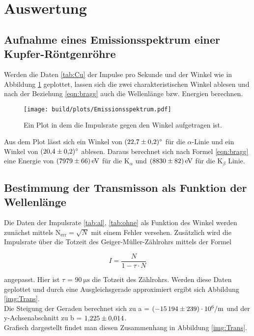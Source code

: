 \section{Auswertung}

    \subsection{Aufnahme eines Emissionsspektrum einer Kupfer-Röntgenröhre}

        \noindent Werden die Daten \ref{tab:Cu} der Impulse pro Sekunde und der Winkel wie in Abbildung \ref{img:Spekt} geplottet, lassen sich die zwei 
        charakteristischen Winkel ablesen und nach der Beziehung \ref{eqn:bragg} auch die Wellenlänge bzw. Energien berechnen.

            \begin{figure}
                \centering
                \texttt{[image: build/plots/Emissionsspektrum.pdf]}
                \caption{Ein Plot in dem die Impulsrate gegen den Winkel aufgetragen ist.}
                \label{img:Spekt}
            \end{figure}

        \noindent Aus dem Plot lässt sich ein Winkel von $\SI{22.7 \pm 0.2}{\degree}$ für die $\alpha$-Linie und ein Winkel von $\SI{20.4 \pm 0.2}{\degree}$
        ablesen. Daraus berechnet sich nach Formel \ref{eqn:bragg} eine Energie von $\SI{7979 \pm 66}{\electronvolt}$ für die $\text{K}_{\alpha}$ und
        $\SI{8830 \pm 82}{\electronvolt}$ für die $\text{K}_{\beta}$ Linie. 

    \subsection{Bestimmung der Transmisson als Funktion der Wellenlänge}

        \noindent Die Daten der Impulsrate \ref{tab:al}, \ref{tab:ohne} als Funktion des Winkel werden zunächst mittels $\text{N}_{\text{err}}=\sqrt{N}$ mit einem Fehler versehen.
        Zusätzlich wird die Impulsrate über die Totzeit des Geiger-Müller-Zählrohrs mittels der Formel 
        
            \begin{equation}
                I = \frac{N}{1 - \tau \cdot N}
            \end{equation}
        
        \noindent angepasst. Hier ist $\tau$ = $\SI{90}{\micro\second}$ die Totzeit des Zählrohrs. Werden diese Daten geplottet und durch eine 
        Ausgleichsgerade approximiert ergibt sich Abbildung \ref{img:Trans}.\\ Die Steigung der Geraden berechnet sich zu 
        a = $\SI{-15194  (239)e6}{\per\meter}$ und der y-Achsenabschnitt zu b = $\num{1.225 \pm 0.014}$.\\
        Grafisch dargestellt findet man diesen Zusammenhang in Abbildung \ref{img:Trans}.

